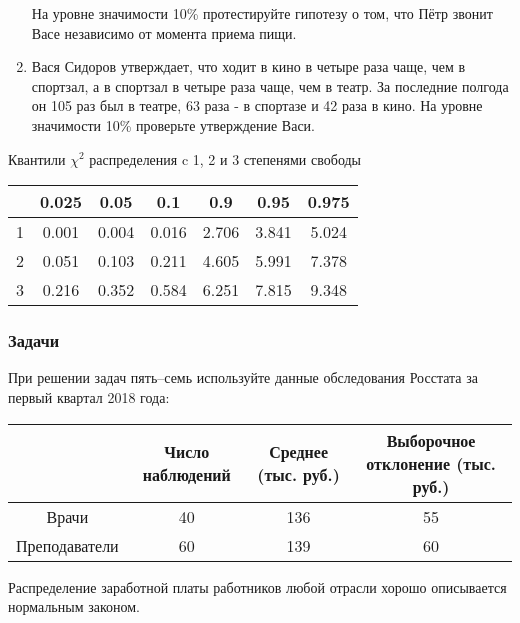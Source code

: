 \begin{enumerate}
	На уровне значимости 10\% протестируйте гипотезу о том, что Пётр звонит Васе независимо от момента приема пищи.


\item Вася Сидоров утверждает, что ходит в кино в четыре раза чаще, чем в спортзал, а в спортзал в четыре раза чаще, чем в театр. За последние полгода он 105 раз был в театре, 63 раза - в спортазе и 42 раза в кино. На уровне значимости 10\% проверьте утверждение Васи.

\end{enumerate}


	\begin{center}
	Квантили $\chi^2$ распределения c 1, 2 и 3 степенями свободы\\
		\begin{tabular}{c|cccccc}
			\toprule
			& 0.025 & 0.05 & 0.1 & 0.9 & 0.95 & 0.975\\
			\midrule
							1 & 0.001 & 0.004 & 0.016 & 2.706 & 3.841 & 5.024 \\
							2 & 0.051 & 0.103 & 0.211 & 4.605 & 5.991 & 7.378 \\
							3 & 0.216 & 0.352 & 0.584 & 6.251 & 7.815 & 9.348 \\
			\bottomrule
		\end{tabular}
	\end{center}

\newpage

\subsubsection*{Задачи}

При решении задач пять–семь используйте данные обследования Росстата за первый квартал 2018 года:

	\begin{center}
		\begin{tabular}{c|ccc}
			\toprule
			& Число наблюдений & Среднее (тыс. руб.) & Выборочное отклонение (тыс. руб.) \\
			\midrule
							Врачи & 40 & 136 & 55  \\
							Преподаватели & 60 & 139 & 60 \\
			\bottomrule
		\end{tabular}
	\end{center}

Распределение заработной платы работников любой отрасли хорошо описывается нормальным законом.

